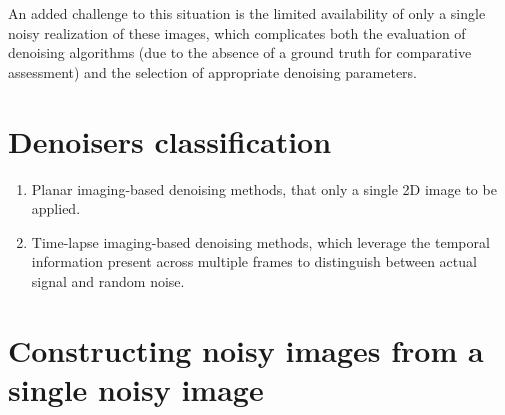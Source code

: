 An added challenge to this situation is the limited availability of
only a single noisy realization of these images, which complicates
both the evaluation of denoising algorithms (due to the absence of a
ground truth for comparative assessment) and the selection of
appropriate denoising parameters. 


\section{Denoisers classification}

\begin{enumerate}
  
\item Planar imaging-based denoising methods, that only a single 2D image to be applied.



\item Time-lapse imaging-based denoising methods, which leverage the
  temporal information present across multiple frames to distinguish
  between actual signal and random noise.
  


\end{enumerate}

\section{Constructing noisy images from a single noisy image}

